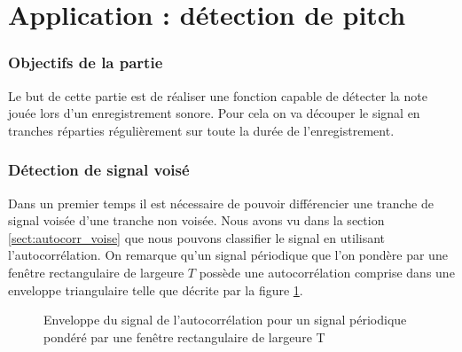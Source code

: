 \documentclass[french]{article}
\begin{document}
\FloatBarrier
\clearpage
\part{Application : détection de pitch}

\section*{Objectifs de la partie}
Le but de cette partie est de réaliser une fonction capable de détecter la note jouée lors d'un enregistrement sonore. Pour cela on va découper le signal en tranches réparties régulièrement sur toute la durée de l'enregistrement.

\section{Détection de signal voisé}

Dans un premier temps il est nécessaire de pouvoir différencier une tranche de signal voisée d'une tranche non voisée. Nous avons vu dans la section \ref{sect:autocorr_voise} que nous pouvons classifier le signal en utilisant l'autocorrélation. On remarque qu'un signal périodique que l'on pondère par une fenêtre rectangulaire de largeure $T$ possède une autocorrélation comprise dans une enveloppe triangulaire telle que décrite par la figure \ref{fig:enveloppe}.

\begin{figure}[h!]
	\centering
	\caption[Enveloppe de l'autocorrélation]{Enveloppe du signal de l'autocorrélation pour un signal périodique pondéré par une fenêtre rectangulaire de largeure T}
	\label{fig:enveloppe}
\end{figure}
\end{document}
